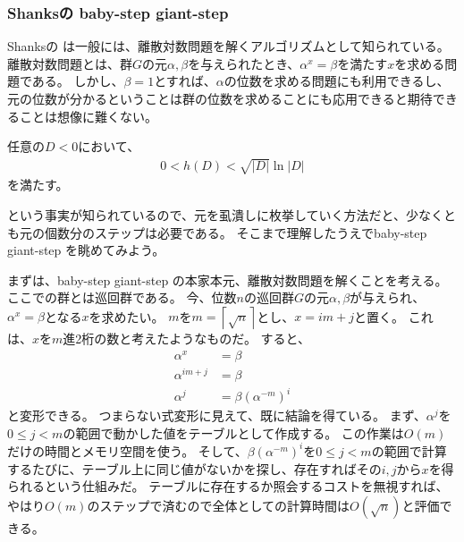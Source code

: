 
\subsubsection{Shanksの baby-step giant-step}
Shanksの  は一般には、離散対数問題を解くアルゴリズムとして知られている。
離散対数問題とは、群$G$の元$\alpha,\beta$を与えられたとき、$\alpha^x=\beta$を満たす$x$を求める問題である。
しかし、$\beta=1$とすれば、$\alpha$の位数を求める問題にも利用できるし、元の位数が分かるということは群の位数を求めることにも応用できると期待できることは想像に難くない。

\begin{Prop}{}{}
任意の$D<0$において、
\begin{align*}
0 < h(D) < \sqrt{|D|}\ln{|D|}
\end{align*}
を満たす。
\end{Prop}

という事実が知られているので、元を虱潰しに枚挙していく方法だと、少なくとも元の個数分のステップは必要である。
そこまで理解したうえでbaby-step giant-step を眺めてみよう。

まずは、baby-step giant-step の本家本元、離散対数問題を解くことを考える。
ここでの群とは巡回群である。
今、位数$n$の巡回群$G$の元$\alpha,\beta$が与えられ、$\alpha^x=\beta$となる$x$を求めたい。
$m$を$m=\left\lceil \sqrt{n} \right\rceil$とし、$x=im+j$と置く。
これは、$x$を$m$進2桁の数と考えたようなものだ。
すると、
\begin{align*}
\alpha^x &= \beta\\
\alpha^{im+j} &= \beta\\
\alpha^j &= \beta(\alpha^{-m})^i
\end{align*}
と変形できる。
つまらない式変形に見えて、既に結論を得ている。
まず、$\alpha^j$を$0\le j<m$の範囲で動かした値をテーブルとして作成する。
この作業は$O(m)$だけの時間とメモリ空間を使う。
そして、$\beta(\alpha^{-m})^i$を$0\le j<m$の範囲で計算するたびに、テーブル上に同じ値がないかを探し、存在すればその$i,j$から$x$を得られるという仕組みだ。
テーブルに存在するか照会するコストを無視すれば、やはり$O(m)$のステップで済むので全体としての計算時間は$O(\sqrt{n})$と評価できる。


